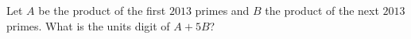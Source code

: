 Let $A$ be the product of the first $2013$ primes and $B$ the product of the next $2013$ primes. What is the units digit of $A+5B$?
